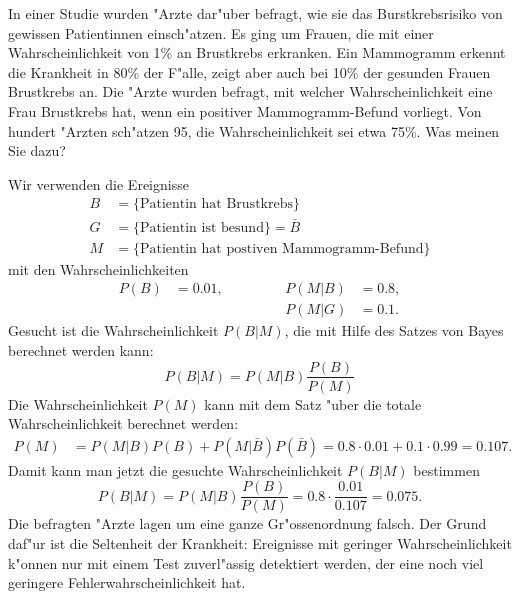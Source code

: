 In einer Studie wurden "Arzte dar"uber befragt, wie sie das Burstkrebsrisiko
von gewissen Patientinnen einsch"atzen.
Es ging um Frauen, die mit einer Wahrscheinlichkeit von 1\% an
Brustkrebs erkranken.
Ein Mammogramm erkennt die Krankheit in 80\% der F"alle, zeigt aber auch
bei 10\% der gesunden Frauen Brustkrebs an.
Die "Arzte wurden befragt, mit welcher Wahrscheinlichkeit eine Frau
Brustkrebs hat, wenn ein positiver Mammogramm-Befund vorliegt.
Von hundert "Arzten sch"atzen 95, die Wahrscheinlichkeit sei etwa 75\%.
Was meinen Sie dazu?

\begin{loesung}
Wir verwenden die Ereignisse
\begin{align*}
B&=\{\text{Patientin hat Brustkrebs}\}\\
G&=\{\text{Patientin ist besund}\} =\bar B\\
M&=\{\text{Patientin hat postiven Mammogramm-Befund}\}
\end{align*}
mit den Wahrscheinlichkeiten
\[
\begin{aligned}
P(B)&=0.01,&&\qquad&P(M|B)&=0.8,\\
    &      &&\qquad&P(M|G)&=0.1.
\end{aligned}
\]
Gesucht ist die Wahrscheinlichkeit $P(B|M)$, die mit Hilfe des Satzes
von Bayes berechnet werden kann:
\[
P(B|M) = P(M|B) \frac{P(B)}{P(M)}
\]
Die Wahrscheinlichkeit $P(M)$ kann mit dem Satz "uber die totale
Wahrscheinlichkeit berechnet werden:
\begin{align*}
P(M)
&=
P(M|B)P(B)+P(M|\bar B)P(\bar B)
=
0.8\cdot 0.01 + 0.1\cdot 0.99
=
0.107.
\end{align*}
Damit kann man jetzt die gesuchte Wahrscheinlichkeit $P(B|M)$ bestimmen
\[
P(B|M)
=
P(M|B) \frac{P(B)}{P(M)}
=
0.8 \cdot\frac{0.01}{0.107}
=
0.075.
\]
Die befragten "Arzte lagen um eine ganze Gr"ossenordnung falsch.
Der Grund daf"ur ist die Seltenheit der Krankheit: Ereignisse
mit geringer Wahrscheinlichkeit k"onnen nur mit einem Test zuverl"assig
detektiert werden, der eine noch viel geringere Fehlerwahrscheinlichkeit hat.
\end{loesung}
